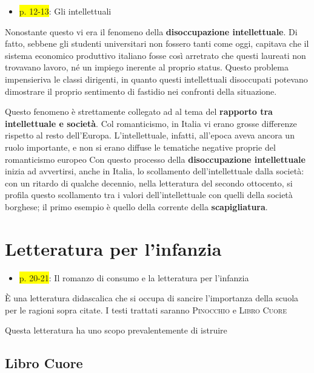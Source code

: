 \documentclass{book}
\newcommand{\pagine}[1]{\colorbox{yellow}{#1}}
\begin{document}
\begin{itemize}

\item
  \pagine{p. 12-13}: Gli intellettuali
\end{itemize}

Nonostante questo vi era il fenomeno della \textbf{disoccupazione
intellettuale}. Di fatto, sebbene gli studenti universitari non fossero
tanti come oggi, capitava che il sistema economico produttivo italiano
fosse così arretrato che questi laureati non trovavano lavoro, né un
impiego inerente al proprio status. Questo problema impensieriva le
classi dirigenti, in quanto questi intellettuali disoccupati potevano
dimostrare il proprio sentimento di fastidio nei confronti della
situazione.

Questo fenomeno è strettamente collegato ad al tema del \textbf{rapporto
tra intellettuale e società}. Col romanticismo, in Italia vi erano
grosse differenze rispetto al resto dell'Europa. L'intellettuale,
infatti, all'epoca aveva ancora un ruolo importante, e non si erano
diffuse le tematiche negative proprie del romanticismo europeo Con
questo processo della \textbf{disoccupazione intellettuale} inizia ad
avvertirsi, anche in Italia, lo scollamento dell'intellettuale dalla
società: con un ritardo di qualche decennio, nella letteratura del
secondo ottocento, si profila questo scollamento tra i valori
dell'intellettuale con quelli della società borghese; il primo esempio è
quello della corrente della \textbf{scapigliatura}.


\section{Letteratura per l'infanzia}

\begin{itemize}

\item
  \pagine{p. 20-21}: Il romanzo di consumo e la letteratura per
  l'infanzia
\end{itemize}

È una letteratura didascalica che si occupa di sancire l'importanza
della scuola per le ragioni sopra citate. I testi trattati saranno
\textsc{Pinocchio} e \textsc{Libro Cuore}

Questa letteratura ha uno scopo prevalentemente di istruire

\subsection{Libro Cuore}
\end{document}
